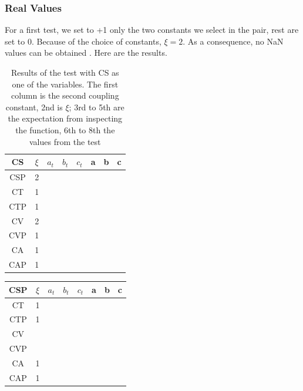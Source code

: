 \documentclass[twocolumn]{article}
\begin{document}
\subsubsection{Real Values}

For a first test, we set to +1 only the two constants we select in the pair, rest are set to 0. Because of the choice of constants, $\xi=2$. As a consequence, no NaN values can be obtained . Here are the results.

\begin{table}[H]
	\begin{tabular}{|c|c|c|c|c|c|c|c|}
		\hline
		CS & $\xi $& $a_t$ & $b_t$ & $c_t$ & a & b & c \\
		\hline
		CSP & 2 &   &   &   &   &   &  \\
		\hline
		CT & 1 &   &   &   &   &   &  \\
		\hline
		CTP & 1 &   &   &   &   &   &  \\
		\hline
		CV & 2 &   &   &   &   &   &  \\
		\hline
		CVP & 1 &   &   &   &   &   &  \\
		\hline
		CA & 1 &   &   &   &   &   &  \\
		\hline
		CAP & 1 &   &   &   &   &   &  \\
		\hline
	\end{tabular}
	\caption{Results of the test with CS as one of the variables. The first column is the second coupling constant, 2nd is $\xi$; 3rd to 5th are the expectation from inspecting the function, 6th to 8th the values from the test}
\end{table}

\begin{table}[H]
	\begin{tabular}{|c|c|c|c|c|c|c|c|}
		\hline
		CSP & $\xi $& $a_t$ & $b_t$ & $c_t$ & a & b & c \\
		\hline
		CT & 1 &   &   &   &   &   &   \\
		\hline
		CTP & 1 &   &   &   &   &   &   \\
		\hline
		CV &   &   &   &   &   &   &   \\
		\hline
		CVP &   &   &   &   &   &   &   \\
		\hline
		CA & 1 &   &   &   &   &   &   \\
		\hline
		CAP & 1 &   &   &   &   &   &   \\
		\hline
	\end{tabular}
\end{table}
\end{document}

